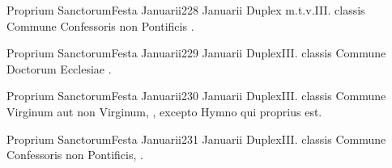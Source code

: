 \documentclass[nocturnale-romanum.tex]{subfiles}
\begin{document}
	{Proprium Sanctorum}{Festa Januarii}{2}{28 Januarii}
	{Duplex m.t.v.}{III. classis}
	{Commune Confessoris non Pontificis \pageref{M-CONP}.}
	{}

	{Proprium Sanctorum}{Festa Januarii}{2}{29 Januarii}
	{Duplex}{III. classis}
	{Commune Doctorum Ecclesiae \pageref{M-CODO}.}
	{}

	{Proprium Sanctorum}{Festa Januarii}{2}{30 Januarii}
	{Duplex}{III. classis}
	{Commune Virginum aut non Virginum, \pageref{M-MU}, excepto Hymno qui proprius est.}
	{}

	{Proprium Sanctorum}{Festa Januarii}{2}{31 Januarii}
	{Duplex}{III. classis}
	{Commune Confessoris non Pontificis, \pageref{M-CONP}.}
	{}
\end{document}
